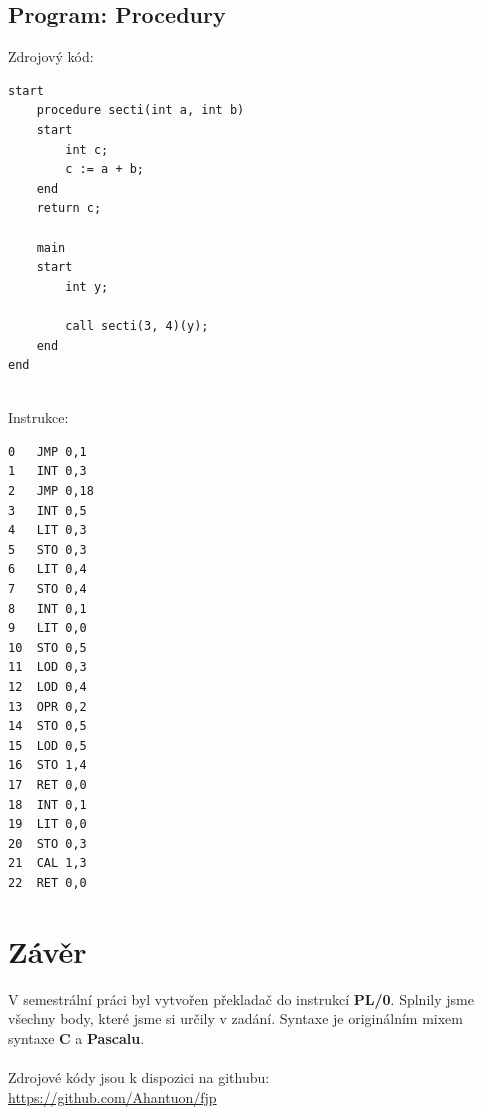 \documentclass[12pt]{report}
\begin{document}
\section{Program: Procedury}
Zdrojový kód:
\begin{verbatim}
start
    procedure secti(int a, int b)
    start
        int c;
        c := a + b;
    end
    return c;

    main
    start
        int y;

        call secti(3, 4)(y);
    end
end
\end{verbatim}
\ \\
Instrukce:
\begin{verbatim}
0	JMP 0,1
1	INT 0,3
2	JMP 0,18
3	INT 0,5
4	LIT 0,3
5	STO 0,3
6	LIT 0,4
7	STO 0,4
8	INT 0,1
9	LIT 0,0
10	STO 0,5
11	LOD 0,3
12	LOD 0,4
13	OPR 0,2
14	STO 0,5
15	LOD 0,5
16	STO 1,4
17	RET 0,0
18	INT 0,1
19	LIT 0,0
20	STO 0,3
21	CAL 1,3
22	RET 0,0
\end{verbatim}


\chapter{Závěr}
V semestrální práci byl vytvořen překladač do instrukcí \textbf{PL/0}. Splnily jsme všechny body, které jsme si určily v zadání.
Syntaxe je originálním mixem syntaxe \textbf{C} a \textbf{Pascalu}.
\\\\
Zdrojové kódy jsou k dispozici na githubu:\\ \url{https://github.com/Ahantuon/fjp} 
\end{document}
